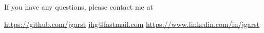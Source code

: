 \documentclass[11pt,a4paper]{article}
\begin{document}
\vfill

\begin{center}
    If you have any questions, please contact me at
\end{center}

\begin{center}
    \href{https://github.com/jgarst}{https://github.com/jgarst} 
    \textbullet{} 
    \href{jhg@fastmail.com}{jhg@fastmail.com}
    \textbullet{} 
    \href{https://www.linkedin.com/in/jgarst}
        {https://www.linkedin.com/in/jgarst}
\end{center}
\end{document}
